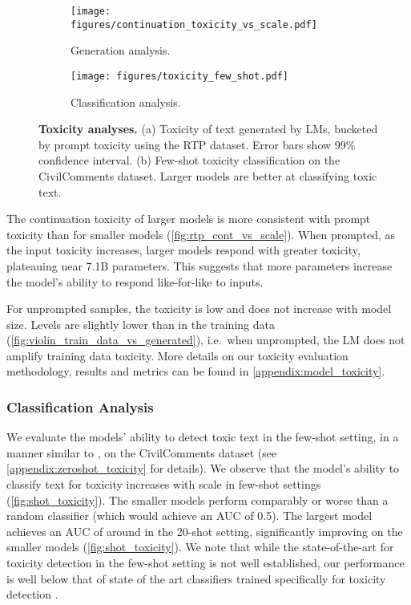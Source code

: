\documentclass[11pt, a4paper, logo, internal, copyright, nonumbering]{deepmind}
\begin{document}
\begin{figure}[t]
\centering
\begin{subfigure}{.48\textwidth}
  \hspace{1.5em}
  \texttt{[image: figures/continuation\_toxicity\_vs\_scale.pdf]}
  \caption{Generation analysis.}
  \label{fig:rtp_cont_vs_scale}
\end{subfigure}
\hspace{1em}
\begin{subfigure}{.48\textwidth}
    \texttt{[image: figures/toxicity\_few\_shot.pdf]}\vspace{-0.5mm}
    \caption{Classification analysis.}
    \label{fig:shot_toxicity}
\end{subfigure}
  \caption{\textbf{Toxicity analyses.} 
  (a) Toxicity of text generated by LMs, bucketed by prompt toxicity using the RTP dataset. Error bars show 99\% confidence interval.
  (b) Few-shot toxicity classification on the CivilComments dataset.  
  Larger models are better at classifying toxic text.
  }
\label{fig:rtp}
\end{figure}


The continuation toxicity of larger models is more consistent with prompt toxicity than for smaller models (\autoref{fig:rtp_cont_vs_scale}). 
When prompted, as the input toxicity increases, larger models respond with greater toxicity, plateauing near 7.1B parameters. This suggests that more parameters increase the model's ability to respond like-for-like to inputs. 

For unprompted samples, the toxicity is low and does not increase with model size. Levels are slightly lower than in the training data (\autoref{fig:violin_train_data_vs_generated}), i.e.~when unprompted, the LM does not amplify training data toxicity.
More details on our toxicity evaluation methodology, results and metrics can be found in \autoref{appendix:model_toxicity}.



\subsubsection{Classification Analysis}
\label{sec:toxicity}
We evaluate the models' ability to detect toxic text in the few-shot setting, in a manner similar to \cite{selfdiagnosis}, on the CivilComments dataset \citep{nuanced_metrics} (see  \autoref{appendix:zeroshot_toxicity} for details). 
We observe that the model's ability to classify text for toxicity increases with scale in few-shot settings (\autoref{fig:shot_toxicity}).
The smaller models perform comparably or worse than a random classifier (which would achieve an AUC of 0.5).
The largest model achieves an AUC of around  in the 20-shot setting, significantly improving on the smaller models (\autoref{fig:shot_toxicity}). 
We note that while the state-of-the-art for toxicity detection in the few-shot setting is not well established, our performance is well below that 
of state of the art classifiers 
trained specifically for toxicity detection
\citep{nuanced_metrics}.
\end{document}

